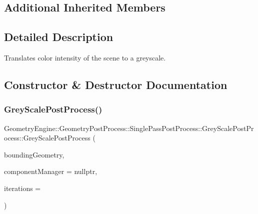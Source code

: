 \subsection*{Additional Inherited Members}


\subsection{Detailed Description}
Translates color intensity of the scene to a greyscale. 

\subsection{Constructor \& Destructor Documentation}
\mbox{\label{class_geometry_engine_1_1_geometry_post_process_1_1_single_pass_post_process_1_1_grey_scale_post_process_a1072395d3c80b7765ff98a2fdb211de1}} 
\subsubsection{\texorpdfstring{GreyScalePostProcess()}{GreyScalePostProcess()}\hspace{0.1cm}{\footnotesize\ttfamily [1/2]}}
{\footnotesize\ttfamily Geometry\+Engine\+::\+Geometry\+Post\+Process\+::\+Single\+Pass\+Post\+Process\+::\+Grey\+Scale\+Post\+Process\+::\+Grey\+Scale\+Post\+Process (\begin{DoxyParamCaption}\item[{const \mbox{\hyperlink{class_geometry_engine_1_1_geometry_world_item_1_1_geometry_item_1_1_geometry_item}{Geometry\+World\+Item\+::\+Geometry\+Item\+::\+Geometry\+Item}} \&}]{bounding\+Geometry,  }\item[{const \mbox{\hyperlink{class_geometry_engine_1_1_custom_shading_1_1_custom_post_process_step_interface}{Custom\+Shading\+::\+Custom\+Post\+Process\+Step\+Interface}} $\ast$const}]{component\+Manager = {\ttfamily nullptr},  }\item[{unsigned int}]{iterations = {} }\end{DoxyParamCaption})}

